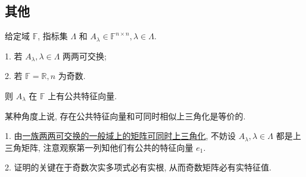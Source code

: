 \documentclass[../../main.tex]{subfiles}%
\begin{document}
\subsection{其他}

\begin{theorem}[公共特征值]\label{theorem:公共特征值}
给定域 \( \mathbb{F} \), 指标集 \( \Lambda \) 和 \( A_\lambda \in \mathbb{F}^{n \times n}, \lambda \in \Lambda \).

1. 若 \( A_\lambda, \lambda \in \Lambda \) 两两可交换;

2. 若 \( \mathbb{F} = \mathbb{R}, n \) 为奇数.

则 \( A_\lambda \) 在 \( \mathbb{F} \) 上有公共特征向量.
\end{theorem}
\begin{note}
某种角度上说, 存在公共特征向量和可同时相似上三角化是等价的.

1. 由\hyperref[proposition:一族两两可交换的一般域上的矩阵可同时上三角化]{一族两两可交换的一般域上的矩阵可同时上三角化}, 不妨设 \( A_\lambda, \lambda \in \Lambda \) 都是上三角矩阵, 注意观察第一列知他们有公共的特征向量 \( e_1 \).

2. 证明的关键在于奇数次实多项式必有实根, 从而奇数矩阵必有实特征值.
\end{note}
\end{document}
